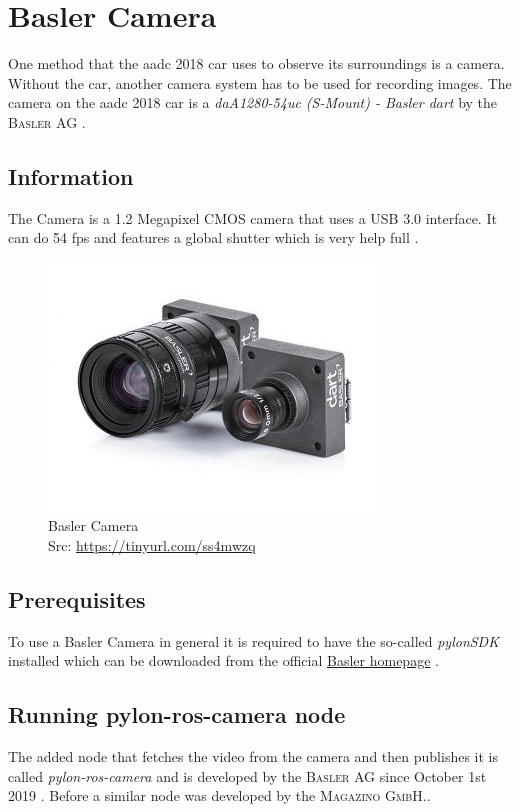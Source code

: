 
\chapter{Basler Camera\authorA}\label{ref:lsdslam}
One method that the \gls{aadc} 2018 car uses to observe its surroundings is a camera. Without the car, another camera system has to be used for recording images. The camera on the \gls{aadc} 2018 car is a \textit{daA1280-54uc (S-Mount) - Basler dart} by the \textsc{Basler AG} \cite{daA12854uc}.

\section{Information}
The Camera is a 1.2 Megapixel CMOS camera that uses a USB 3.0 interface. It can do 54 \gls{fps} and features a global shutter which is very help full \cite{baslerCamera}.
\begin{figure}[h]
	\centering
	\includegraphics[height=0.3\textwidth]{./media/images/Basler-Camera.jpg}
  	\caption{Basler Camera
  	\\Src: \url{https://tinyurl.com/ss4mwzq}}
  	\label{orbslamkittidataset}
\end{figure}

\section{Prerequisites}
To use a Basler Camera in general it is required to have the so-called \textit{pylonSDK} installed which can be downloaded from the official \href{https://www.baslerweb.com/de/vertrieb-support/downloads/downloads-software/}{Basler homepage} \cite{pylonsdkdownloadpage}.

\section{Running pylon-ros-camera node}
The added node that fetches the video from the camera and then publishes it is called \textit{pylon-ros-camera} and is developed by the \textsc{Basler AG} since October 1st 2019 \cite{pylonroscamera}. Before a similar node was developed by the \textsc{Magazino GmbH}.\cite{pyloncamera}.

